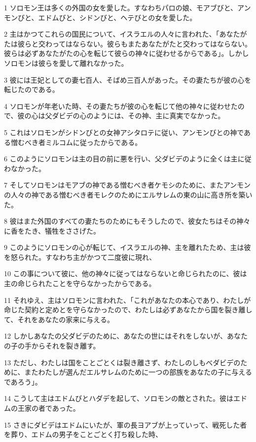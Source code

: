 \par 1 ソロモン王は多くの外国の女を愛した。すなわちパロの娘、モアブびと、アンモンびと、エドムびと、シドンびと、ヘテびとの女を愛した。
\par 2 主はかつてこれらの国民について、イスラエルの人々に言われた、「あなたがたは彼らと交わってはならない。彼らもまたあなたがたと交わってはならない。彼らは必ずあなたがたの心を転じて彼らの神々に従わせるからである」。しかしソロモンは彼らを愛して離れなかった。
\par 3 彼には王妃としての妻七百人、そばめ三百人があった。その妻たちが彼の心を転じたのである。
\par 4 ソロモンが年老いた時、その妻たちが彼の心を転じて他の神々に従わせたので、彼の心は父ダビデの心のようには、その神、主に真実でなかった。
\par 5 これはソロモンがシドンびとの女神アシタロテに従い、アンモンびとの神である憎むべき者ミルコムに従ったからである。
\par 6 このようにソロモンは主の目の前に悪を行い、父ダビデのように全くは主に従わなかった。
\par 7 そしてソロモンはモアブの神である憎むべき者ケモシのために、またアンモンの人々の神である憎むべき者モレクのためにエルサレムの東の山に高き所を築いた。
\par 8 彼はまた外国のすべての妻たちのためにもそうしたので、彼女たちはその神々に香をたき、犠牲をささげた。
\par 9 このようにソロモンの心が転じて、イスラエルの神、主を離れたため、主は彼を怒られた。すなわち主がかつて二度彼に現れ、
\par 10 この事について彼に、他の神々に従ってはならないと命じられたのに、彼は主の命じられたことを守らなかったからである。
\par 11 それゆえ、主はソロモンに言われた、「これがあなたの本心であり、わたしが命じた契約と定めとを守らなかったので、わたしは必ずあなたから国を裂き離して、それをあなたの家来に与える。
\par 12 しかしあなたの父ダビデのために、あなたの世にはそれをしないが、あなたの子の手からそれを裂き離す。
\par 13 ただし、わたしは国をことごとくは裂き離さず、わたしのしもべダビデのために、またわたしが選んだエルサレムのために一つの部族をあなたの子に与えるであろう」。
\par 14 こうして主はエドムびとハダデを起して、ソロモンの敵とされた。彼はエドムの王家の者であった。
\par 15 さきにダビデはエドムにいたが、軍の長ヨアブが上っていって、戦死した者を葬り、エドムの男子をことごとく打ち殺した時、

